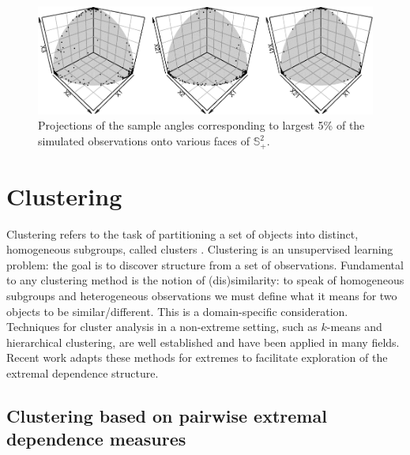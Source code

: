 \documentclass[en-GB, a4paper, nobind]{templates/bathreport}
\begin{document}
\begin{figure}
\includegraphics[width=1\linewidth]{figures/simHR-exploratory-3dscatters-1} \caption[Projected sample angles for the simulated data.]{Projections of the sample angles corresponding to largest 5\% of the simulated observations onto various faces of $\mathbb{S}_+^{2}$.}\label{fig:simHR-exploratory-3dscatters}
\end{figure}

\hypertarget{clustering}{%
\section{Clustering}\label{clustering}}

Clustering refers to the task of partitioning a set of objects into distinct, homogeneous subgroups, called clusters \autocite{jamesIntroductionStatisticalLearning2021}. Clustering is an unsupervised learning problem: the goal is to discover structure from a set of observations. Fundamental to any clustering method is the notion of (dis)similarity: to speak of homogeneous subgroups and heterogeneous observations we must define what it means for two objects to be similar/different. This is a domain-specific consideration. Techniques for cluster analysis in a non-extreme setting, such as \(k\)-means and hierarchical clustering, are well established and have been applied in many fields. Recent work adapts these methods for extremes to facilitate exploration of the extremal dependence structure.

\hypertarget{clustering-based-on-pairwise-extremal-dependence-measures}{%
\subsection{Clustering based on pairwise extremal dependence measures}\label{clustering-based-on-pairwise-extremal-dependence-measures}}
\end{document}

